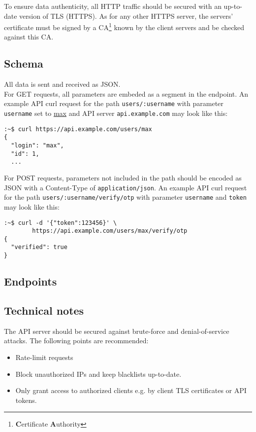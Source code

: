 To ensure data authenticity, all HTTP traffic should be secured with an
up-to-date version of TLS (HTTPS). As for any other HTTPS server, the servers'
certificate must be signed by a CA\footnote{\textbf{C}ertificate
\textbf{A}uthority} known by the client servers and be checked against this CA.


\subsection{Schema}

All data is sent and received as JSON. \\

For GET requests, all parameters are embeded as a segment in the endpoint. An
example API curl request for the path \verb+users/:username+ with parameter
\verb+username+ set to \underline{max} and API server \verb+api.example.com+
may look like this:

\begin{lstlisting}[language=none, numbers=none]
:~$ curl https://api.example.com/users/max
{
  "login": "max",
  "id": 1,
  ...
\end{lstlisting}

For POST requests, parameters not included in the path should be encoded as JSON
with a Content-Type of \verb+application/json+. An example API curl request for
the path \verb+users/:username/verify/otp+ with parameter \verb+username+ and
\verb+token+ may look like this:

\begin{lstlisting}[language=none, numbers=none]
:~$ curl -d '{"token":123456}' \
        https://api.example.com/users/max/verify/otp
{
  "verified": true
}
\end{lstlisting}


\subsection{Endpoints}

\newcommand{\includeApiDefinition}[1]{
	\begin{minipage}{\textwidth}
	
	\end{minipage}
}


\includeApiDefinition{login_credentials}
\includeApiDefinition{ssh_keys}
\includeApiDefinition{ssh_keys_notify}
\includeApiDefinition{verify_otp}


\subsection{Technical notes}

The API server should be secured against brute-force and denial-of-service
attacks. The following points are recommended:

\begin{itemize}
	\item Rate-limit requests
	\item Block unauthorized IPs and keep blacklists up-to-date.
	\item Only grant access to authorized clients e.g. by client TLS
		certificates or API tokens.
\end{itemize}
